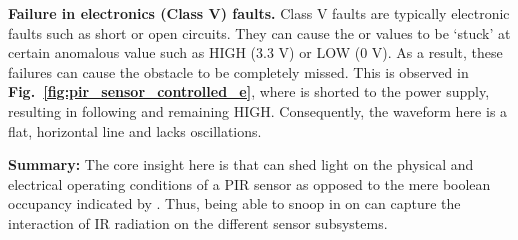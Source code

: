\textbf{Failure in electronics (Class V) faults.} Class V faults are typically electronic faults such as short or open circuits. They can cause the \aout or \cout values to be `stuck' at certain anomalous value such as HIGH (3.3 V) or LOW (0 V). As a result, these failures can cause the obstacle to be completely missed. This is observed in {\bfseries Fig.~\ref{fig:pir_sensor_controlled_e}}, where \aout is shorted to the power supply, resulting in \cout following \aout and remaining HIGH. Consequently, the \aout waveform here is a flat, horizontal line and lacks oscillations. 
%

\noindent \textbf{Summary:} The core insight here is that \aout can shed light on the physical and electrical operating conditions of a PIR sensor as opposed to the mere boolean occupancy indicated by \cout. Thus, being able to snoop in on \aout can capture the interaction of IR radiation on the different sensor subsystems. 


